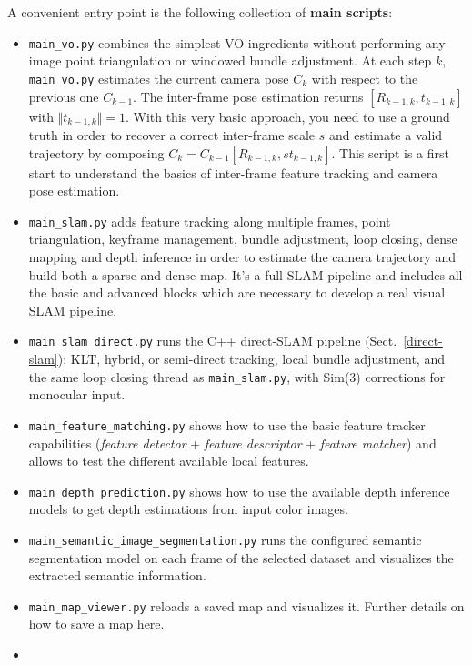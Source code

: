 \documentclass{article}
\begin{document}
A convenient entry point is the following collection of \textbf{main scripts}:
\begin{itemize}
\item 
\texttt{main\_vo.py} combines the simplest VO
ingredients without performing any image point triangulation or windowed
bundle adjustment. At each step \(k\), \texttt{main\_vo.py} estimates
the current camera pose \(C_k\) with respect to the previous one
\(C_{k-1}\). The inter-frame pose estimation returns
\([R_{k-1,k},t_{k-1,k}]\) with \(\Vert t_{k-1,k} \Vert=1\). With this
very basic approach, you need to use a ground truth in order to recover
a correct inter-frame scale \(s\) and estimate a valid trajectory by
composing \(C_k = C_{k-1} [R_{k-1,k}, s t_{k-1,k}]\). This script is a
first start to understand the basics of inter-frame feature tracking and
camera pose estimation.
\item
  \texttt{main\_slam.py} adds feature tracking along multiple frames,
  point triangulation, keyframe management, bundle adjustment, loop
  closing, dense mapping and depth inference in order to estimate the
  camera trajectory and build both a sparse and dense map. It's a full
  SLAM pipeline and includes all the basic and advanced blocks which are
  necessary to develop a real visual SLAM pipeline.
\item
  \texttt{main\_slam\_direct.py} runs the C++ direct-SLAM pipeline
  (Sect.~\ref{direct-slam}): KLT, hybrid, or semi-direct tracking, local
  bundle adjustment, and the same loop closing thread as
  \texttt{main\_slam.py}, with Sim(3) corrections for monocular input.
\item
  \texttt{main\_feature\_matching.py} shows how to use the basic feature
  tracker capabilities (\emph{feature detector} + \emph{feature
  descriptor} + \emph{feature matcher}) and allows to test the different
  available local features.
\item
  \texttt{main\_depth\_prediction.py} shows how to use the available
  depth inference models to get depth estimations from input color
  images.
\item
  \texttt{main\_semantic\_image\_segmentation.py} runs the configured
  semantic segmentation model on each frame of the selected dataset and
  visualizes the extracted semantic information.
\item
  \texttt{main\_map\_viewer.py} reloads a saved map and visualizes it.
  Further details on how to save a map
  \protect\hyperlink{reload-a-saved-map-and-relocalize-in-it}{here}.
\item

\end{itemize}
\end{document}
